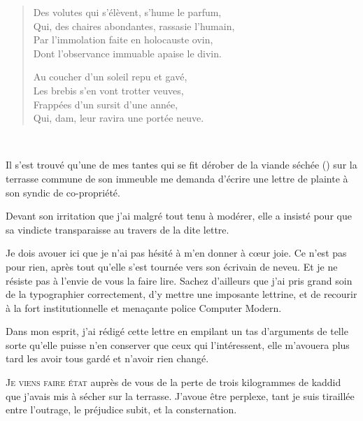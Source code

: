 \begin{verse}
  Des volutes qui s’élèvent, s’hume le parfum,\\
  Qui, des chaires abondantes, rassasie l’humain,\\
  Par l’immolation faite en holocauste ovin,\\
  Dont l’observance immuable apaise le divin.

  Au coucher d’un soleil repu et gavé,\\
  Les brebis s’en vont trotter veuves,\\
  Frappées d’un sursit d’une année,\\
  Qui, dam, leur ravira une portée neuve.\\
\end{verse}

\pagebreak
\thispagestyle{empty}
~
\vfill
\pagebreak

\begin{prose}
  Il s’est trouvé qu’une de mes tantes qui se
  fit dérober de la viande séchée () sur la terrasse commune de son immeuble
  me demanda d’écrire une lettre de plainte à son syndic de co-propriété.

  Devant son irritation que j’ai malgré tout tenu  à modérer, elle a insisté pour que sa vindicte transparaisse au travers de la dite lettre.

  Je dois avouer ici que je n’ai pas hésité à m’en donner à cœur joie. Ce n’est pas pour rien, après tout qu’elle s’est tournée vers son écrivain de neveu. Et je ne résiste pas à l’envie de vous la faire lire. Sachez d’ailleurs que j’ai pris grand soin de la typographier correctement, d’y mettre une imposante lettrine, et de recourir à la fort institutionnelle et menaçante police Computer Modern.

  Dans mon esprit, j’ai rédigé cette lettre en empilant un tas d’arguments de telle sorte qu’elle puisse n’en conserver que ceux qui l’intéressent, elle m’avouera plus tard les avoir tous gardé et n’avoir rien changé.
\end{prose}

\lettrine[lines=3]{J}{e viens faire état} auprès de vous de la perte de trois kilogrammes de kaddid que j’avais mis à sécher sur la terrasse.
%
J’avoue être perplexe, tant je suis tiraillée entre l’outrage, le préjudice subit, et la consternation.

